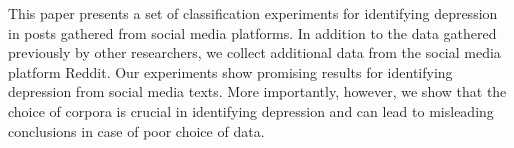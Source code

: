 This paper presents a set of classification experiments for identifying depression in posts gathered from social media platforms. In addition to the data gathered previously by other researchers, we collect additional data from the social media platform Reddit. Our experiments show promising results for identifying depression from social media texts. More importantly, however, we show that the choice of corpora is crucial in identifying depression and can lead to misleading conclusions in case of poor choice of data.
